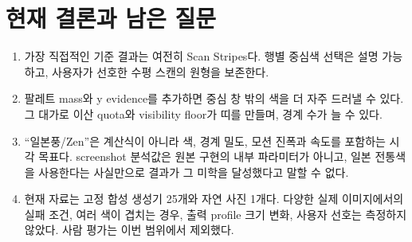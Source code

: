 \documentclass[10pt]{article}
\begin{document}
\section{현재 결론과 남은 질문}
\begin{enumerate}[leftmargin=1.4em,itemsep=1pt]
  \item 가장 직접적인 기준 결과는 여전히 Scan Stripes다. 행별 중심색 선택은 설명 가능하고, 사용자가 선호한 수평 스캔의 원형을 보존한다.
  \item 팔레트 mass와 y evidence를 추가하면 중심 창 밖의 색을 더 자주 드러낼 수 있다. 그 대가로 이산 quota와 visibility floor가 띠를 만들며, 경계 수가 늘 수 있다.
  \item “일본풍/Zen”은 계산식이 아니라 색, 경계 밀도, 모션 진폭과 속도를 포함하는 시각 목표다. screenshot 분석값은 원본 구현의 내부 파라미터가 아니고, 일본 전통색을 사용한다는 사실만으로 결과가 그 미학을 달성했다고 말할 수 없다.
  \item 현재 자료는 고정 합성 생성기 25개와 자연 사진 1개다. 다양한 실제 이미지에서의 실패 조건, 여러 색이 겹치는 경우, 출력 profile 크기 변화, 사용자 선호는 측정하지 않았다. 사람 평가는 이번 범위에서 제외했다.
\end{enumerate}
\end{document}
